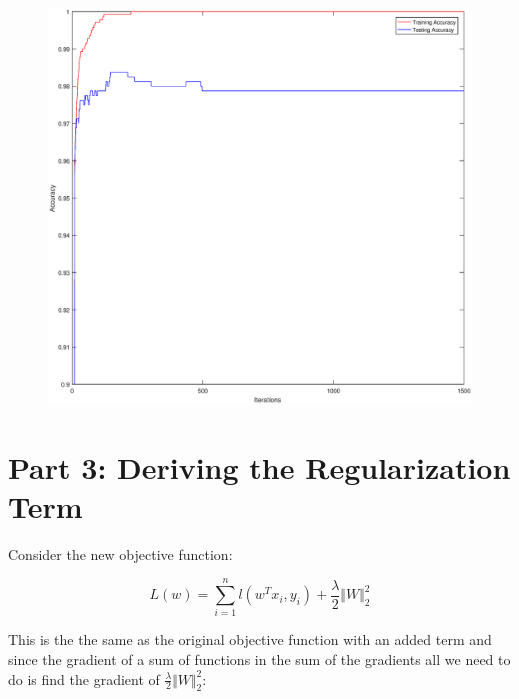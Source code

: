 \documentclass{article}
\begin{document}
	\begin{figure}[h!]
	\begin{center} 
		\includegraphics[scale=0.4]{iter_accuracy2.eps} 
	\end{center}  
	\label{fig:M4}
\end{figure}


	\section*{Part 3: Deriving the Regularization Term}
Consider the new objective function:
	
	$$
	L(w) = \sum_{i = 1}^{n} l(w^{T} x_{i}, y_{i}) + \frac{\lambda}{2} \Vert W \Vert_{2}^{2}
	$$
	
	This is the the same as the original objective function with an added term and since the gradient of a sum of functions in the sum of the gradients all we need to do is find the gradient of $\frac{\lambda}{2} \Vert W \Vert_{2}^{2}$:
	
\end{document}
